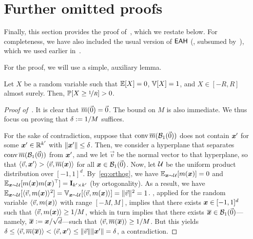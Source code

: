 \section{Further omitted proofs}
\label{sec:aux}

Finally, this section provides the proof of~, which we restate below. For completeness, we have also included the usual version of $\textsf{EAH}$ (, subsumed by~), which we used earlier in~.

\lowdeg*

For the proof, we will use a simple, auxiliary lemma.

\begin{lemma}
    \label{lemma:range}
    Let $X$ be a random variable such that $\operatorname*{\mathbb E}[X] = 0$, $\mathbb{V}[X] = 1$, and $X \in [-R, R]$ almost surely. Then, $\mathbb{P}[X \geq \nicefrac{1}{R}] > 0$.
\end{lemma}

\begin{proof}[Proof of~]
    It is clear that $\overline{m}(\vec{0}) = \vec{0}$. The bound on $M$ is also immediate. We thus focus on proving that $\delta := 1/M$ suffices.
    
    For the sake of contradiction, suppose that $\operatorname{conv} \overline{m}({\mathcal{B}}_1(\vec{0}))$ does not contain ${\bm{x}}'$ for some ${\bm{x}}' \in \mathbb R^{k'}$ with $\| {\bm{x}}' \| \leq \delta$. Then, we consider a hyperplane that separates $\operatorname{conv} \overline{m}({\mathcal{B}}_1(\vec{0}))$ from ${\bm{x}}'$, and we let $\vec{v}$ be the normal vector to that hyperplane, so that $\langle \vec{v}, {\bm{x}}' \rangle > \langle \vec{v}, \overline{m}({\bm{x}}) \rangle$ for all ${\bm{x}} \in {\mathcal{B}}_1(\vec{0})$. Now, let ${\mathcal{U}}$ be the uniform product distribution over $[-1, 1]^d$. By~\eqref{eq:orthog}, we have $\operatorname*{\mathbb E}_{{\bm{x}} \sim {\mathcal{U}}} [m({\bm{x}})] = 0$ and $\operatorname*{\mathbb E}_{ {\bm{x}} \sim {\mathcal{U}}} [ m({\bm{x}}) m({\bm{x}})^\top] = {\mathbf{I}}_{k' \times k'}$ (by ortogonality). As a result, we have $\operatorname*{\mathbb E}_{ {\bm{x}} \sim {\mathcal{U}}} [  \langle \vec{v}, m({\bm{x}}) \rangle^2 ] = \mathbb{V}_{{\bm{x}} \sim {\mathcal{U}}}[ \langle \vec{v}, m({\bm{x}}) \rangle ] = \|\vec{v} \|^2 = 1$. , applied for the random variable $\langle \vec{v}, m({\bm{x}}) \rangle$ with range $[-M, M]$, implies that there exists ${\bm{x}} \in [-1, 1]^d$ such that $\langle \vec{v}, m({\bm{x}}) \rangle \geq 1/M$, which in turn implies that there exists $\overline{{\bm{x}}} \in {\mathcal{B}}_1(\vec{0})$---namely, $\overline{{\bm{x}}} := {\bm{x}}/\sqrt{d}$---such that $\langle \vec{v}, \overline{m}(\overline{{\bm{x}}}) \rangle \geq 1/M$. But this yields $\delta \leq \langle \vec{v}, \overline{m}(\overline{{\bm{x}}}) \rangle < \langle \vec{v}, {\bm{x}}' \rangle \leq \|\vec{v} \| \|{\bm{x}}'\| = \delta$, a contradiction.
\end{proof}

